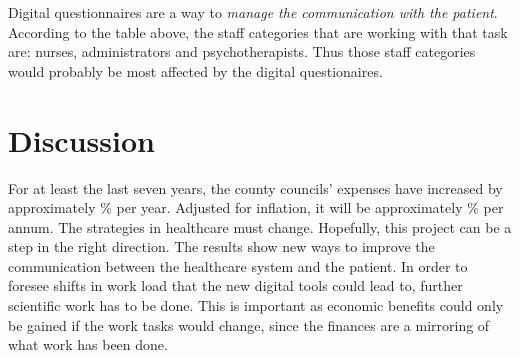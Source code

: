 \documentclass[12pt,a4paper,oneside]{article}
\let\oldcite\cite
\renewcommand*\cite[1]{\textsuperscript{\oldcite{#1}}}
\begin{document}
\newpage
Digital questionnaires are a way to {\it manage the communication with the patient}. According to the table above, the staff categories that are working with that task are: nurses, administrators and psychotherapists. Thus those staff categories would probably be most affected by the digital questionaires.



\section*{Discussion}
For at least the last seven years, the county councils' expenses have increased by approximately {}\% per year. Adjusted for inflation, it will be approximately {}\% per annum\cite{numbers3.1, numbers3.2}. The strategies in healthcare must change. Hopefully, this project can be a step in the right direction. The results show new ways to improve the communication between the healthcare system and the patient. 
In order to foresee shifts in work load that the new digital tools could lead to, further scientific work has to be done. This is important as economic benefits could only be gained if the work tasks would change, since the finances are a mirroring of what work has been done.
\end{document}
